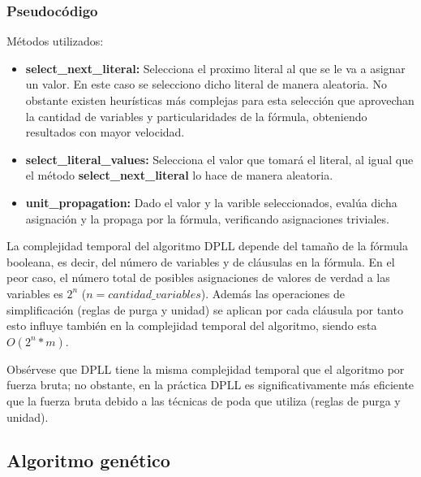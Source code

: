 \documentclass{article}
\begin{document}
            \subsubsection*{Pseudocódigo}

                Métodos utilizados:
                \begin{itemize}
                    \item \textbf{select\_next\_literal:} Selecciona el proximo literal al que se le va a asignar un valor. En este caso se selecciono
                    dicho literal de manera aleatoria. No obstante existen heurísticas más complejas para esta selección que aprovechan la cantidad de 
                    variables y particularidades de la fórmula, obteniendo resultados con mayor velocidad.
                    \item \textbf{select\_literal\_values:} Selecciona el valor que tomará el literal, al igual que el método
                     \textbf{select\_next\_literal} lo hace de manera aleatoria.
                    \item \textbf{unit\_propagation:} Dado el valor y la varible seleccionados, evalúa dicha asignación y la propaga por la fórmula, 
                    verificando asignaciones triviales.
                \end{itemize}

                La complejidad temporal del algoritmo DPLL depende del tamaño de la fórmula booleana, es decir, del 
                número de variables y de cláusulas en la fórmula. En el peor caso, el número total de posibles asignaciones de 
                valores de verdad a las variables es $2^n$ ($n=cantidad\_variables$). Además las operaciones de simplificación
                (reglas de purga y unidad) se aplican por cada cláusula por tanto esto influye también en la complejidad temporal
                del algoritmo, siendo esta $O(2^n*m)$.

                Obsérvese que DPLL tiene la misma complejidad temporal que el algoritmo por fuerza bruta; no obstante, en la práctica 
                DPLL es significativamente más eficiente que la fuerza bruta debido a las técnicas de poda que utiliza (reglas de purga y unidad).
    
    \subsection*{Algoritmo genético}
        
\end{document}
